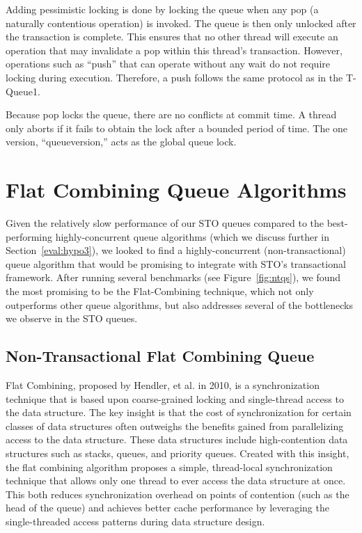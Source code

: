 Adding pessimistic locking is done by locking the queue when any pop (a naturally contentious operation) is invoked. The queue is then only unlocked after the transaction is complete. This ensures that no other thread will execute an operation that may invalidate a pop within this thread's transaction. However, operations such as ``push'' that can operate without any wait do not require locking during execution. Therefore, a push follows the same protocol as in the T-Queue1.

Because pop locks the queue, there are no conflicts at commit time. A thread only aborts if it fails to obtain the lock after a bounded period of time. The one version, “queueversion,” acts as the global queue lock. 


\section{Flat Combining Queue Algorithms}
Given the relatively slow performance of our STO queues compared to the best-performing highly-concurrent queue algorithms (which we discuss further in Section~\ref{eval:hypo3}), we looked to find a highly-concurrent (non-transactional) queue algorithm that would be promising to integrate with STO's transactional framework. After running several benchmarks (see Figure~\ref{fig:ntqs}), we found the most promising to be the Flat-Combining technique, which not only outperforms other queue algorithms, but also addresses several of the bottlenecks we observe in the STO queues.

\subsection{Non-Transactional Flat Combining Queue}
\label{fcqueuent}

Flat Combining, proposed by Hendler, et al. in 2010\cite{flatcombining}, is a synchronization technique that is based upon coarse-grained locking and single-thread access to the data structure. The key insight is that the cost of synchronization for certain classes of data structures often outweighs the benefits gained from parallelizing access to the data structure. These data structures include high-contention data structures such as stacks, queues, and priority queues. Created with this insight, the flat combining algorithm proposes a simple, thread-local synchronization technique that allows only one thread to ever access the data structure at once. This both reduces synchronization overhead on points of contention (such as the head of the queue) and achieves better cache performance by leveraging the single-threaded access patterns during data structure design.

